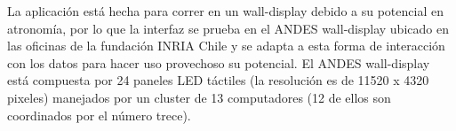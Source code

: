 \begin{intro}
La aplicaci\'on est\'a hecha para correr en un wall-display debido a su potencial en atronom\'ia, por lo que la interfaz se prueba en el ANDES wall-display ubicado en las oficinas de la fundaci\'on INRIA Chile y se adapta a esta forma de interacci\'on con los datos para hacer uso provechoso su potencial. El ANDES wall-display está compuesta por 24 paneles LED táctiles (la resoluci\'on es de 11520 x 4320 pixeles) manejados por un cluster de 13 computadores (12 de ellos son coordinados por el n\'umero trece).

\end{intro}